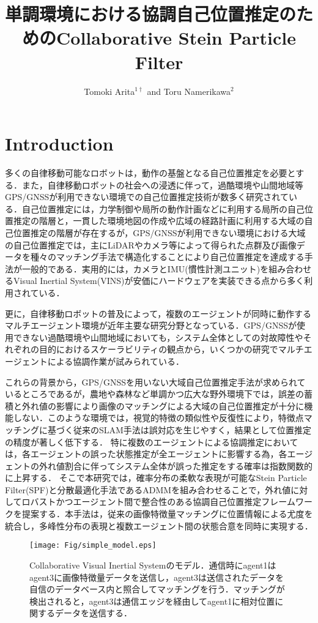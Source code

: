 \documentclass[a4paper,fleqn,10pt,twocolumn]{SICE_ISCS}
\title{単調環境における協調自己位置推定のためのCollaborative Stein Particle Filter}
\author{Tomoki Arita${}^{1\dagger}$ and Toru Namerikawa${}^{2}$}
\begin{document}
\maketitle


\section{Introduction}
多くの自律移動可能なロボットは，動作の基盤となる自己位置推定を必要とする．また，自律移動ロボットの社会への浸透に伴って，過酷環境や山間地域等GPS/GNSSが利用できない環境での自己位置推定技術が数多く研究されている．自己位置推定には，力学制御や局所の動作計画などに利用する局所の自己位置推定の階層と，一貫した環境地図の作成や広域の経路計画に利用する大域の自己位置推定の階層が存在するが，GPS/GNSSが利用できない環境における大域の自己位置推定では，主にLiDARやカメラ等によって得られた点群及び画像データを種々のマッチング手法で構造化することにより自己位置推定を達成する手法が一般的である．実用的には，カメラとIMU(慣性計測ユニット)を組み合わせるVisual Inertial System(VINS)が安価にハードウェアを実装できる点から多く利用されている\cite{Qin2018}．

更に，自律移動ロボットの普及によって，複数のエージェントが同時に動作するマルチエージェント環境が近年主要な研究分野となっている．GPS/GNSSが使用できない過酷環境や山間地域においても，システム全体としての対故障性やそれぞれの目的におけるスケーラビリティの観点から，いくつかの研究でマルチエージェントによる協調作業が試みられている\cite{Chen2021}\cite{Zhou2018}．

これらの背景から，GPS/GNSSを用いない大域自己位置推定手法が求められているところであるが，農地や森林など単調かつ広大な野外環境下では，誤差の蓄積と外れ値の影響により画像のマッチングによる大域の自己位置推定が十分に機能しない．このような環境では，視覚的特徴の類似性や反復性により，特徴点マッチングに基づく従来のSLAM手法は誤対応を生じやすく，結果として位置推定の精度が著しく低下する．
特に複数のエージェントによる協調推定においては，各エージェントの誤った状態推定が全エージェントに影響する為，各エージェントの外れ値割合に伴ってシステム全体が誤った推定をする確率は指数関数的に上昇する．
そこで本研究では，確率分布の柔軟な表現が可能なStein Particle Filter(SPF)\cite{Liu2016}と分散最適化手法であるADMMを組み合わせることで，外れ値に対してロバストかつエージェント間で整合性のある協調自己位置推定フレームワークを提案する．本手法は，従来の画像特徴量マッチングに位置情報による尤度を統合し，多峰性分布の表現と複数エージェント間の状態合意を同時に実現する．
\begin{figure}[t]
	\begin{center}
		\texttt{[image: Fig/simple\_model.eps]}
		\caption{Collaborative Visual Inertial Systemのモデル．通信時にagent1はagent3に画像特徴量データを送信し，agent3は送信されたデータを自信のデータベース内と照合してマッチングを行う．マッチングが検出されると，agent3は通信エッジを経由してagent1に相対位置に関するデータを送信する．}
		\label{fig:simple_model}
	\end{center}
	\vspace{-2mm}
\end{figure}
\end{document}

